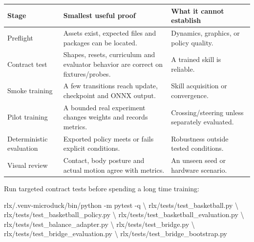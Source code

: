 \documentclass[
  american,
  11pt,
  letterpaper,
]{article}
\newenvironment{Shaded}{\begin{snugshade}}{\end{snugshade}}
\newcommand{\AttributeTok}[1]{\textcolor[rgb]{0.13,0.29,0.53}{#1}}
\newcommand{\DataTypeTok}[1]{\textcolor[rgb]{0.13,0.29,0.53}{#1}}
\newcommand{\ExtensionTok}[1]{#1}
\newcommand{\NormalTok}[1]{#1}
\newcounter{none} %
\renewenvironment{Shaded}{\par\smallskip}{\par\smallskip}
\begin{document}
{\def\LTcaptype{none} %
\begin{longtable}[]{@{}
  >{\raggedright\arraybackslash}p{}
  >{\raggedright\arraybackslash}p{}
  >{\raggedright\arraybackslash}p{}@{}}
\toprule\noalign{}
\begin{minipage}[b]{\linewidth}\raggedright
Stage
\end{minipage} & \begin{minipage}[b]{\linewidth}\raggedright
Smallest useful proof
\end{minipage} & \begin{minipage}[b]{\linewidth}\raggedright
What it cannot establish
\end{minipage} \\
\midrule\noalign{}
\endhead
\bottomrule\noalign{}
\endlastfoot
Preflight & Assets exist, expected files and packages can be located. &
Dynamics, graphics, or policy quality. \\
Contract test & Shapes, resets, curriculum and evaluator behavior are
correct on fixtures/probes. & A trained skill is reliable. \\
Smoke training & A few transitions reach update, checkpoint and ONNX
output. & Skill acquisition or convergence. \\
Pilot training & A bounded real experiment changes weights and records
metrics. & Crossing/steering unless separately evaluated. \\
Deterministic evaluation & Exported policy meets or fails explicit
conditions. & Robustness outside tested conditions. \\
Visual review & Contact, body posture and actual motion agree with
metrics. & An unseen seed or hardware scenario. \\
\end{longtable}
}

Run targeted contract tests before spending a long time training:

\begin{Shaded}
\begin{Highlighting}[]
\ExtensionTok{rlx/.venv{-}microduck/bin/python} \AttributeTok{{-}m}\NormalTok{ pytest }\AttributeTok{{-}q} \DataTypeTok{\textbackslash{}}
\NormalTok{  rlx/tests/test\_basketball.py }\DataTypeTok{\textbackslash{}}
\NormalTok{  rlx/tests/test\_basketball\_policy.py }\DataTypeTok{\textbackslash{}}
\NormalTok{  rlx/tests/test\_basketball\_evaluation.py }\DataTypeTok{\textbackslash{}}
\NormalTok{  rlx/tests/test\_balance\_adapter.py }\DataTypeTok{\textbackslash{}}
\NormalTok{  rlx/tests/test\_bridge.py }\DataTypeTok{\textbackslash{}}
\NormalTok{  rlx/tests/test\_bridge\_evaluation.py }\DataTypeTok{\textbackslash{}}
\NormalTok{  rlx/tests/test\_bridge\_bootstrap.py}
\end{Highlighting}
\end{Shaded}
\end{document}
